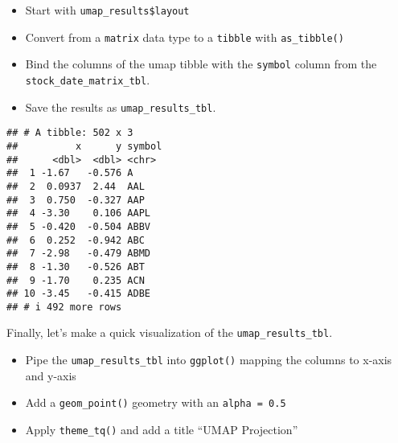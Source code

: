 \documentclass[
]{article}
\newenvironment{Shaded}{\begin{snugshade}}{\end{snugshade}}
\newcommand{\AttributeTok}[1]{\textcolor[rgb]{0.13,0.29,0.53}{#1}}
\newcommand{\CommentTok}[1]{\textcolor[rgb]{0.56,0.35,0.01}{\textit{#1}}}
\newcommand{\FunctionTok}[1]{\textcolor[rgb]{0.13,0.29,0.53}{\textbf{#1}}}
\newcommand{\NormalTok}[1]{#1}
\newcommand{\OtherTok}[1]{\textcolor[rgb]{0.56,0.35,0.01}{#1}}
\newcommand{\SpecialCharTok}[1]{\textcolor[rgb]{0.81,0.36,0.00}{\textbf{#1}}}
\newcommand{\StringTok}[1]{\textcolor[rgb]{0.31,0.60,0.02}{#1}}
\providecommand{\tightlist}{%
  \setlength{\itemsep}{0pt}\setlength{\parskip}{0pt}}
\begin{document}
\begin{itemize}
\tightlist
\item
  Start with \texttt{umap\_results\$layout}
\item
  Convert from a \texttt{matrix} data type to a \texttt{tibble} with
  \texttt{as\_tibble()}
\item
  Bind the columns of the umap tibble with the \texttt{symbol} column
  from the \texttt{stock\_date\_matrix\_tbl}.
\item
  Save the results as \texttt{umap\_results\_tbl}.
\end{itemize}

\begin{Shaded}
\end{Shaded}

\begin{verbatim}
## # A tibble: 502 x 3
##          x      y symbol
##      <dbl>  <dbl> <chr> 
##  1 -1.67   -0.576 A     
##  2  0.0937  2.44  AAL   
##  3  0.750  -0.327 AAP   
##  4 -3.30    0.106 AAPL  
##  5 -0.420  -0.504 ABBV  
##  6  0.252  -0.942 ABC   
##  7 -2.98   -0.479 ABMD  
##  8 -1.30   -0.526 ABT   
##  9 -1.70    0.235 ACN   
## 10 -3.45   -0.415 ADBE  
## # i 492 more rows
\end{verbatim}

Finally, let's make a quick visualization of the
\texttt{umap\_results\_tbl}.

\begin{itemize}
\tightlist
\item
  Pipe the \texttt{umap\_results\_tbl} into \texttt{ggplot()} mapping
  the columns to x-axis and y-axis
\item
  Add a \texttt{geom\_point()} geometry with an \texttt{alpha\ =\ 0.5}
\item
  Apply \texttt{theme\_tq()} and add a title ``UMAP Projection''
\end{itemize}
\end{document}
